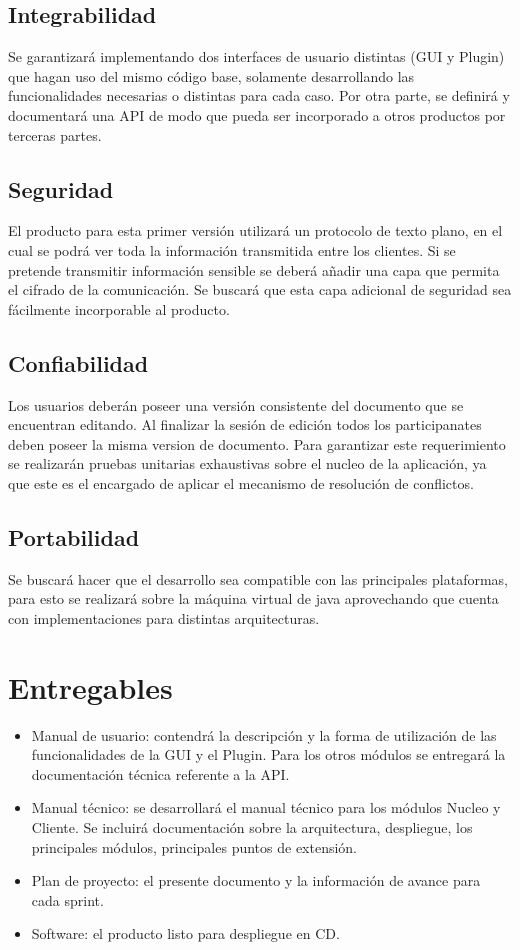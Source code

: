 \documentclass[12pt,a4paper]{article}
\begin{document}
\subsection{Integrabilidad} Se garantizará implementando dos interfaces de usuario distintas (GUI y Plugin) que hagan uso del mismo código base, solamente desarrollando las funcionalidades necesarias o distintas para cada caso.
Por otra parte, se definirá y documentará una API de modo que pueda ser incorporado a otros productos por terceras partes.

\subsection{Seguridad} El producto para esta primer versión utilizará un protocolo de texto plano, en el cual se podrá ver toda la información transmitida entre los clientes. Si se pretende transmitir información sensible se deberá añadir una capa que permita el cifrado de la comunicación. Se buscará que esta capa adicional de seguridad sea fácilmente incorporable al producto.

\subsection{Confiabilidad} Los usuarios deberán poseer una versión consistente del documento que se encuentran editando. Al finalizar la sesión de edición todos los participanates deben poseer la misma version de documento. Para garantizar este requerimiento se realizarán pruebas unitarias exhaustivas sobre el nucleo de la aplicación, ya que este es el encargado de aplicar el mecanismo de resolución de conflictos.

\subsection{Portabilidad} Se buscará hacer que el desarrollo sea compatible con las principales plataformas, para esto se realizará sobre la máquina virtual de java aprovechando que cuenta con implementaciones para distintas arquitecturas.	
	
	\section{Entregables}

	\begin{itemize}
	\item Manual de usuario: contendrá la descripción y la forma de utilización de las funcionalidades de la GUI y el Plugin. Para los otros módulos se entregará la documentación técnica referente a la API.
	\item Manual técnico: se desarrollará el manual técnico para los módulos Nucleo y Cliente. Se incluirá documentación sobre la arquitectura, despliegue, los principales módulos, principales puntos de extensión.
	\item Plan de proyecto: el presente documento y la información de avance para cada sprint.
	\item Software: el producto listo para despliegue en CD.
	\end{itemize}
\end{document}
